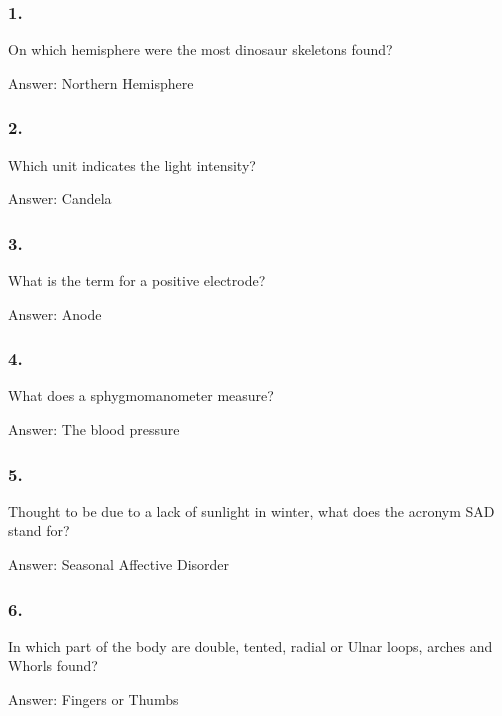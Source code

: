\documentclass{beamer}
\begin{document}
    \begin{frame}
        \frametitle{1.}
        On which hemisphere were the most dinosaur skeletons found?\\

        \begin{center}
            Answer: Northern Hemisphere
        \end{center}
    \end{frame}

    \begin{frame}
        \frametitle{2.}
        Which unit indicates the light intensity?\\

        \begin{center}
            Answer: Candela
        \end{center}
    \end{frame}

    \begin{frame}
        \frametitle{3.}
        What is the term for a positive electrode?\\

        \begin{center}
            Answer: Anode
        \end{center}
    \end{frame}

    \begin{frame}
        \frametitle{4.}
        What does a sphygmomanometer measure?\\

        \begin{center}
            Answer: The blood pressure
        \end{center}
    \end{frame}

    \begin{frame}
        \frametitle{5.}
        Thought to be due to a lack of sunlight in winter, what does the
        acronym SAD stand for?\\

        \begin{center}
            Answer: Seasonal Affective Disorder
        \end{center}
    \end{frame}

    \begin{frame}
        \frametitle{6.}
        In which part of the body are double, tented, radial or Ulnar loops,
        arches and Whorls found?\\

        \begin{center}
            Answer: Fingers or Thumbs
        \end{center}
    \end{frame}
\end{document}
